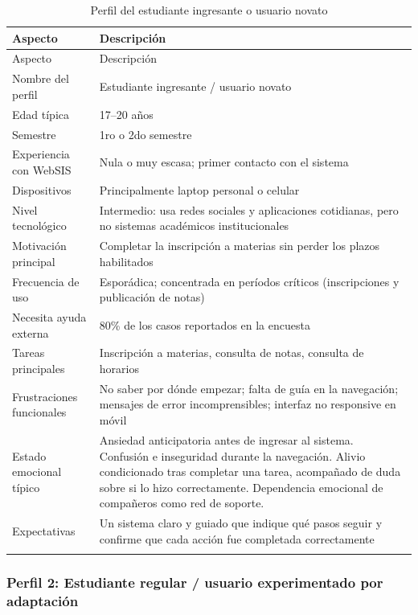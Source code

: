 \begin{longtable}{|p{4.5cm}|p{9cm}|}
\hline
Aspecto & Descripción \\
\hline
\endfirsthead

\hline
Aspecto & Descripción \\
\hline
\endhead

Nombre del perfil & Estudiante ingresante / usuario novato \\
Edad típica & 17--20 años \\
Semestre & 1ro o 2do semestre \\
Experiencia con WebSIS & Nula o muy escasa; primer contacto con el sistema \\
Dispositivos & Principalmente laptop personal o celular \\
Nivel tecnológico & Intermedio: usa redes sociales y aplicaciones cotidianas, pero no sistemas académicos institucionales \\
Motivación principal & Completar la inscripción a materias sin perder los plazos habilitados \\
Frecuencia de uso & Esporádica; concentrada en períodos críticos (inscripciones y publicación de notas) \\
Necesita ayuda externa & 80\% de los casos reportados en la encuesta \\
Tareas principales & Inscripción a materias, consulta de notas, consulta de horarios \\
Frustraciones funcionales & No saber por dónde empezar; falta de guía en la navegación; mensajes de error incomprensibles; interfaz no responsive en móvil \\
Estado emocional típico & Ansiedad anticipatoria antes de ingresar al sistema. Confusión e inseguridad durante la navegación. Alivio condicionado tras completar una tarea, acompañado de duda sobre si lo hizo correctamente. Dependencia emocional de compañeros como red de soporte. \\
Expectativas & Un sistema claro y guiado que indique qué pasos seguir y confirme que cada acción fue completada correctamente \\
\hline
\caption{Perfil del estudiante ingresante o usuario novato}\label{tab:perfil-ingresante-novato}
\end{longtable}

\newpage

\subsubsection{Perfil 2: Estudiante regular / usuario experimentado por adaptación}

